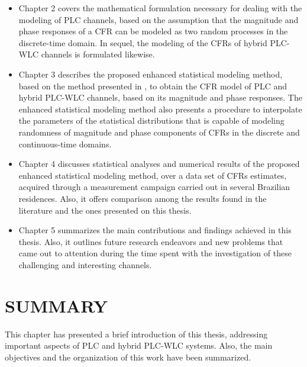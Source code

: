 \begin{itemize}
	\item Chapter 2 covers the mathematical formulation necessary for dealing with the modeling of \ac{PLC} channels, based on the assumption that the magnitude and phase responses of a \ac{CFR} can be modeled as two random processes in the discrete-time domain. In sequel, the modeling of the \acp{CFR}  of hybrid \ac{PLC}-\ac{WLC} channels is formulated likewise.
	
	\item Chapter 3 describes the proposed enhanced statistical modeling method, based on the method presented in \cite{Luis:AI,Luis:doc}, to obtain the \ac{CFR} model of \ac{PLC} and hybrid \ac{PLC}-\ac{WLC} channels, based on its magnitude and phase responses. The enhanced statistical modeling method also presents a procedure to interpolate the parameters of the statistical distributions that is capable of modeling randomness of magnitude and phase components of \acp{CFR} in the discrete and continuous-time domains.
	
	\item Chapter 4 discusses statistical analyses and numerical results of the proposed enhanced statistical modeling method, over a data set of \acp{CFR} estimates, acquired through a measurement campaign carried out in several Brazilian residences. Also, it offers comparison among the results found in the literature and the ones presented on this thesis.
	 
	\item Chapter 5 summarizes the main contributions and findings achieved in this thesis. Also, it outlines future research endeavors and new problems that came out to attention during the time spent with the investigation of these challenging and interesting channels.
\end{itemize}

\section{SUMMARY} \label{sec:I3}

This chapter has presented a brief introduction of this thesis, addressing important aspects of \ac{PLC} and hybrid \ac{PLC}-\ac{WLC} systems. Also, the main objectives and the organization of this work have been summarized.